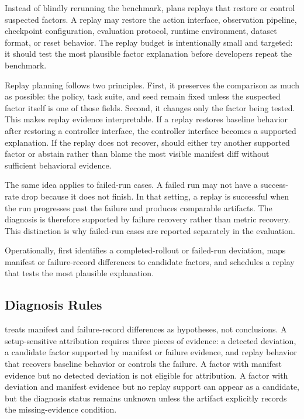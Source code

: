 Instead of blindly rerunning the benchmark, \sys plans replays that restore or control suspected factors. A replay may restore the action interface, observation pipeline, checkpoint configuration, evaluation protocol, runtime environment, dataset format, or reset behavior. The replay budget is intentionally small and targeted: it should test the most plausible factor explanation before developers repeat the benchmark.

Replay planning follows two principles. First, it preserves the comparison as much as possible: the policy, task suite, and seed remain fixed unless the suspected factor itself is one of those fields. Second, it changes only the factor being tested. This makes replay evidence interpretable. If a replay restores baseline behavior after restoring a controller interface, the controller interface becomes a supported explanation. If the replay does not recover, \sys should either try another supported factor or abstain rather than blame the most visible manifest diff without sufficient behavioral evidence.

The same idea applies to failed-run cases. A failed run may not have a success-rate drop because it does not finish. In that setting, a replay is successful when the run progresses past the failure and produces comparable artifacts. The diagnosis is therefore supported by failure recovery rather than metric recovery. This distinction is why failed-run cases are reported separately in the evaluation.

Operationally, \sys first identifies a completed-rollout or failed-run deviation, maps manifest or failure-record differences to candidate factors, and schedules a replay that tests the most plausible explanation.

\subsection{Diagnosis Rules}

\sys treats manifest and failure-record differences as hypotheses, not conclusions. A setup-sensitive attribution requires three pieces of evidence: a detected deviation, a candidate factor supported by manifest or failure evidence, and replay behavior that recovers baseline behavior or controls the failure. A factor with manifest evidence but no detected deviation is not eligible for attribution. A factor with deviation and manifest evidence but no replay support can appear as a candidate, but the diagnosis status remains unknown unless the artifact explicitly records the missing-evidence condition.

